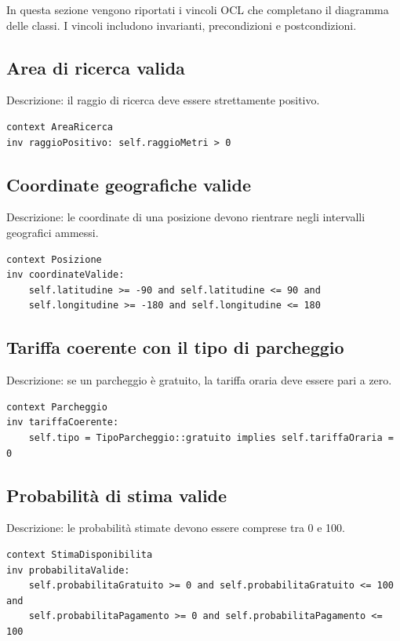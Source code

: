 \documentclass[12pt,a4paper]{article}
\begin{document}
In questa sezione vengono riportati i vincoli OCL che completano il diagramma delle classi. I vincoli includono invarianti, precondizioni e postcondizioni.

\subsection{Area di ricerca valida}
Descrizione: il raggio di ricerca deve essere strettamente positivo.

\begin{verbatim}
context AreaRicerca
inv raggioPositivo: self.raggioMetri > 0
\end{verbatim}

\subsection{Coordinate geografiche valide}
Descrizione: le coordinate di una posizione devono rientrare negli intervalli geografici ammessi.

\begin{verbatim}
context Posizione
inv coordinateValide:
    self.latitudine >= -90 and self.latitudine <= 90 and
    self.longitudine >= -180 and self.longitudine <= 180
\end{verbatim}

\subsection{Tariffa coerente con il tipo di parcheggio}
Descrizione: se un parcheggio è gratuito, la tariffa oraria deve essere pari a zero.

\begin{verbatim}
context Parcheggio
inv tariffaCoerente:
    self.tipo = TipoParcheggio::gratuito implies self.tariffaOraria = 0
\end{verbatim}

\subsection{Probabilità di stima valide}
Descrizione: le probabilità stimate devono essere comprese tra 0 e 100.

\begin{verbatim}
context StimaDisponibilita
inv probabilitaValide:
    self.probabilitaGratuito >= 0 and self.probabilitaGratuito <= 100 and
    self.probabilitaPagamento >= 0 and self.probabilitaPagamento <= 100
\end{verbatim}
\end{document}
